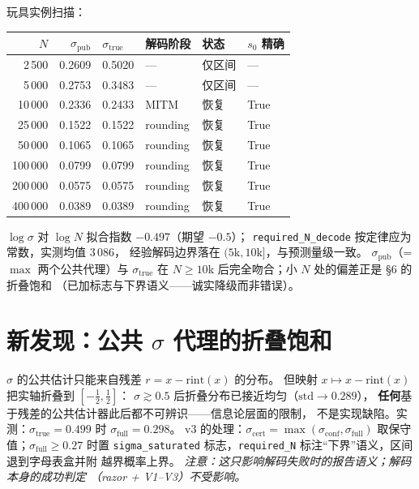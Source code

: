 \documentclass[11pt,a4paper]{ctexart}
\begin{document}
玩具实例扫描：

\begin{table}[htbp]\centering\small
\begin{tabular}{@{}rrllll@{}}
\toprule
$N$ & $\sigma_{\mathrm{pub}}$ & $\sigma_{\mathrm{true}}$ & 解码阶段 & 状态 & $s_0$ 精确 \\
\midrule
2\,500  & 0.2609 & 0.5020 & ---         & 仅区间 & --- \\
5\,000  & 0.2753 & 0.3483 & ---         & 仅区间 & --- \\
10\,000 & 0.2336 & 0.2433 & MITM        & 恢复   & True \\
25\,000 & 0.1522 & 0.1522 & rounding    & 恢复   & True \\
50\,000 & 0.1065 & 0.1065 & rounding    & 恢复   & True \\
100\,000& 0.0799 & 0.0799 & rounding    & 恢复   & True \\
200\,000& 0.0575 & 0.0575 & rounding    & 恢复   & True \\
400\,000& 0.0389 & 0.0389 & rounding    & 恢复   & True \\
\bottomrule
\end{tabular}
\end{table}

$\log\sigma$ 对 $\log N$ 拟合指数 $-0.497$（期望 $-0.5$）；
\texttt{required\_N\_decode} 按定律应为常数，实测均值 $3\,086$，
经验解码边界落在 $(5\mathrm{k},10\mathrm{k}]$，与预测量级一致。
$\sigma_{\mathrm{pub}}$（= $\max$ 两个公共代理）与 $\sigma_{\mathrm{true}}$
在 $N\ge10$k 后完全吻合；小 $N$ 处的偏差正是 \S6 的折叠饱和
（已加标志与下界语义——诚实降级而非错误）。

\section{新发现：公共 $\sigma$ 代理的折叠饱和}

$\sigma$ 的公共估计只能来自残差 $r=x-\mathrm{rint}(x)$ 的分布。
但映射 $x\mapsto x-\mathrm{rint}(x)$ 把实轴折叠到 $[-\frac12,\frac12]$：
$\sigma\gtrsim0.5$ 后折叠分布已接近均匀（$\mathrm{std}\to0.289$），
\textbf{任何}基于残差的公共估计器此后都不可辨识——信息论层面的限制，
不是实现缺陷。实测：$\sigma_{\mathrm{true}}=0.499$ 时
$\sigma_{\mathrm{full}}=0.298$。
v3 的处理：$\sigma_{\mathrm{cert}}=\max(\sigma_{\mathrm{conf}},\sigma_{\mathrm{full}})$
取保守值；$\sigma_{\mathrm{full}}\ge0.27$ 时置 \texttt{sigma\_saturated}
标志，\texttt{required\_N} 标注``下界''语义，区间退到字母表盒并附
越界概率上界。
\emph{注意：这只影响解码失败时的报告语义；解码本身的成功判定
（razor + V1--V3）不受影响。}
\end{document}

